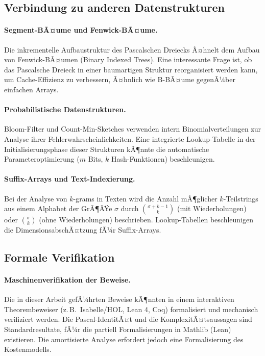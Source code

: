 ﻿\documentclass[12pt, a4paper]{article}
\theoremstyle{plain}
\theoremstyle{definition}
\theoremstyle{remark}
\begin{document}
\subsection{Verbindung zu anderen Datenstrukturen}

\paragraph{Segment-BÃ¤ume und Fenwick-BÃ¤ume.}
Die inkrementelle Aufbaustruktur des Pascalschen Dreiecks Ã¤hnelt
dem Aufbau von Fenwick-BÃ¤umen (Binary Indexed Trees). Eine
interessante Frage ist, ob das Pascalsche Dreieck in einer
baumartigen Struktur reorganisiert werden kann, um Cache-Effizienz
zu verbessern, Ã¤hnlich wie B-BÃ¤ume gegenÃ¼ber einfachen Arrays.

\paragraph{Probabilistische Datenstrukturen.}
Bloom-Filter und Count-Min-Sketches verwenden intern Binomialverteilungen
zur Analyse ihrer Fehlerwahrscheinlichkeiten. Eine integrierte
Lookup-Tabelle in der Initialisierungsphase dieser Strukturen kÃ¶nnte
die automatische Parameteroptimierung ($m$ Bits, $k$ Hash-Funktionen)
beschleunigen.

\paragraph{Suffix-Arrays und Text-Indexierung.}
Bei der Analyse von $k$-grams in Texten wird die Anzahl mÃ¶glicher
$k$-Teilstrings aus einem Alphabet der GrÃ¶ÃŸe $\sigma$ durch
$\binom{\sigma + k - 1}{k}$ (mit Wiederholungen) oder $\binom{\sigma}{k}$
(ohne Wiederholungen) beschrieben. Lookup-Tabellen beschleunigen
die DimensionsabschÃ¤tzung fÃ¼r Suffix-Arrays.

\subsection{Formale Verifikation}

\paragraph{Maschinenverifikation der Beweise.}
Die in dieser Arbeit gefÃ¼hrten Beweise kÃ¶nnten in einem interaktiven
Theorembeweiser (z.\,B.\ Isabelle/HOL, Lean 4, Coq) formalisiert
und mechanisch verifiziert werden. Die Pascal-IdentitÃ¤t und die
KomplexitÃ¤tsaussagen sind Standardresultate, fÃ¼r die partiell
Formalisierungen in Mathlib (Lean) existieren. Die amortisierte
Analyse erfordert jedoch eine Formalisierung des Kostenmodells.
\end{document}
